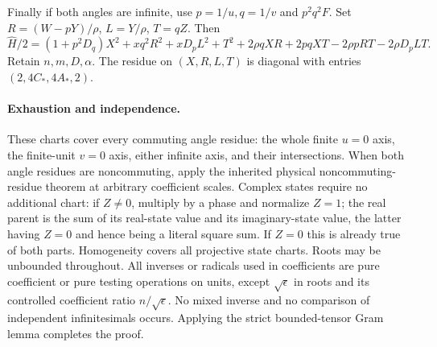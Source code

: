 Finally if both angles are infinite, use $p=1/u,q=1/v$ and
$p^2q^2F$.  Set $R=(W-pY)/\rho$, $L=Y/\rho$, $T=qZ$.  Then
\[
 \widehat H/2=(1+p^2D_q)X^2+xq^2R^2+xD_pL^2+T^2
       +2\rho qXR+2pqXT-2\rho pRT-2\rho D_pLT.
\]
Retain $n,m,D,\alpha$.  The residue on $(X,R,L,T)$ is
diagonal with entries $(2,4C_*,4A_*,2)$.

\paragraph{Exhaustion and independence.}
These charts cover every commuting angle residue: the whole finite
$u=0$ axis, the finite-unit $v=0$ axis, either infinite axis, and
their intersections.  When both angle residues are noncommuting,
apply the inherited physical noncommuting-residue theorem at arbitrary
coefficient scales.  Complex states require no additional chart:
if $Z\ne0$, multiply by a phase and normalize $Z=1$; the real parent
is the sum of its real-state value and its imaginary-state value,
the latter having $Z=0$ and hence being a literal square sum.
If $Z=0$ this is already true of both parts.  Homogeneity covers all
projective state charts.  Roots may be unbounded throughout.
All inverses or radicals used in coefficients are pure coefficient
or pure testing operations on units, except $\sqrt\epsilon$ in
roots and its controlled coefficient ratio $n/\sqrt\epsilon$.
No mixed inverse and no comparison of independent infinitesimals
occurs.  Applying the strict bounded-tensor Gram lemma completes
the proof.
